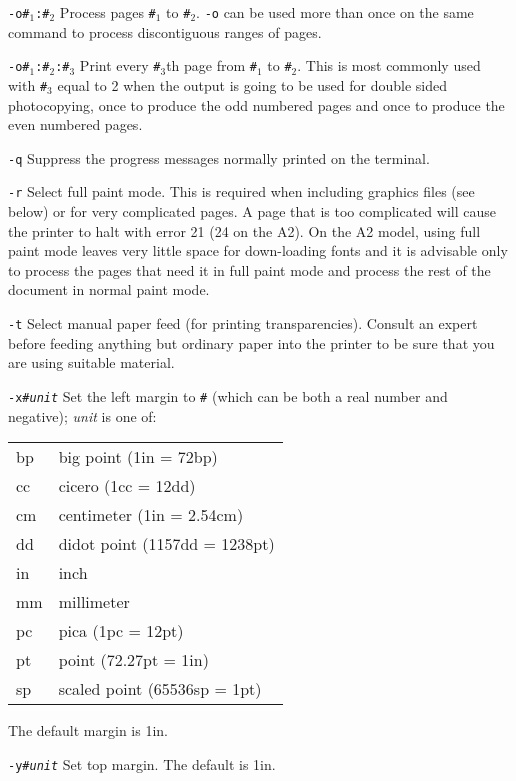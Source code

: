 \begin{list}{}{\settowidth{\labelwidth}{\tt-f\em filename}
\setlength{\leftmargin}{\labelwidth}
\addtolength{\labelwidth}{\labelsep}}
\item[\tt-o\#$_1$:\#$_2$] Process pages {\tt\#$_1$} to {\tt\#$_2$}. {\tt-o}
can be used more than once on the same command to process discontiguous
ranges of pages.

\item[\tt-o\#$_1$:\#$_2$:\#$_3$] Print every {\tt\#$_3$}th page from 
{\tt\#$_1$} to
{\tt\#$_2$}. This is most commonly used with {\tt\#$_3$} equal to 2 when
the output is going to be used for double sided photocopying, once to produce
the odd numbered pages and once to produce the even numbered pages.

\item[\tt-q] Suppress the progress messages normally printed on the terminal.

\item[\tt-r]  Select full paint mode. This is required
when including graphics
files (see below) or for very complicated pages. A page that is too complicated
will cause the printer to halt with error 21 (24 on the A2). On the A2 model, 
using full
paint mode leaves very little space for down-loading fonts and it is advisable
only to process the pages that need it in full paint mode and process the
rest of the document in normal paint mode.


\item[\tt-t]  Select manual paper feed (for printing 
transparencies). Consult
an expert before feeding anything but ordinary paper into the printer to
be sure that you are using suitable material.


\item[\tt-x\#\it unit] Set the left margin to {\tt\#} (which can be both
a real number and negative); {\it unit} is one of:

\begin{tabular}{ll}
bp &big point (1in = 72bp)\\
cc &cicero (1cc = 12dd)\\
cm &centimeter (1in = 2.54cm)\\
dd &didot point (1157dd = 1238pt)\\
in &inch\\
mm &millimeter\\
pc &pica (1pc = 12pt)\\
pt &point (72.27pt = 1in)\\
sp &scaled point (65536sp = 1pt)\\
\end{tabular}

The default margin is 1in.

\item[\tt-y\#\it unit] Set top margin. The default is 1in.
\end{list}

